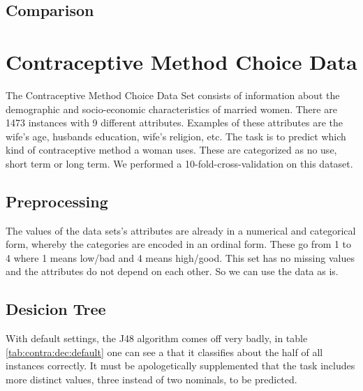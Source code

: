 \documentclass[paper=a4, fontsize=11pt]{scrartcl} %
\numberwithin{equation}{section} %
\numberwithin{figure}{section} %
\numberwithin{table}{section} %
\begin{document}
\subsection{Comparison}




\section{Contraceptive Method Choice Data}

The Contraceptive Method Choice Data Set consists of information about the demographic and socio-economic characteristics of married women. There are 1473 instances with 9 different attributes. Examples of these attributes are the wife's age, husbands education, wife's religion, etc. The task is to predict which kind of contraceptive method a woman uses. These are categorized as no use, short term or long term. We performed a 10-fold-cross-validation on this dataset.

\subsection{Preprocessing}

The values of the data sets's attributes are already in a numerical and categorical form, whereby the categories are encoded in an ordinal form. These go from 1 to 4 where 1 means low/bad and 4 means high/good. This set has no missing values and the attributes do not depend on each other. So we can use the data as is.


\subsection{Desicion Tree}

With default settings, the J48 algorithm comes off very badly, in table \ref{tab:contra:dec:default} one can see a that it classifies about the half of all instances correctly. It must be apologetically supplemented that the task includes more distinct values, three instead of two nominals, to be predicted. 
\end{document}
